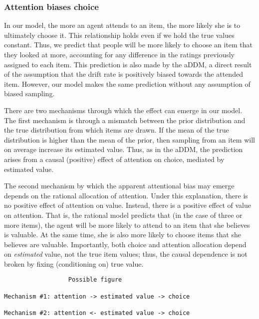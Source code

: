 \documentclass[12pt,a4paperpaper,]{article}
\begin{document}
\subsubsection{Attention biases choice}\label{attention-biases-choice}

In our model, the more an agent attends to an item, the more likely she is to ultimately choose it. This relationship holds even if we hold the true values constant. Thus, we predict that people will be more likely to choose an item that they looked at more, accounting for any difference in the ratings previously assigned to each item. This prediction is also made by the aDDM, a direct result of the assumption that the drift rate is positively biased towards the attended item. However, our model makes the same prediction without any assumption of biased sampling.

There are two mechanisms through which the effect can emerge in our model. The first mechanism is through a mismatch between the prior distribution and the true distribution from which items are drawn. If the mean of the true distribution is higher than the mean of the prior, then sampling from an item will on average increase its estimated value. Thus, as in the aDDM, the prediction arises from a causal (positive) effect of attention on choice, mediated by estimated value.

The second mechanism by which the apparent attentional bias may emerge depends on the rational allocation of attention. Under this explanation, there is no positive effect of attention on value. Instead, there is a positive effect of value on attention. That is, the rational model predicts that (in the case of three or more items), the agent will be more likely to attend to an item that she believes is valuable. At the same time, she is also more likely to choose items that she believes are valuable. Importantly, both choice and attention allocation depend on \emph{estimated} value, not the true item values; thus, the causal dependence is not broken by fixing (conditioning on) true value.

\begin{verbatim}
                  Possible figure

Mechanism #1: attention -> estimated value -> choice

Mechanism #2: attention <- estimated value -> choice
\end{verbatim}




\setlength{\bibleftmargin}{.125in}
\setlength{\bibindent}{-\bibleftmargin}

\end{document}
